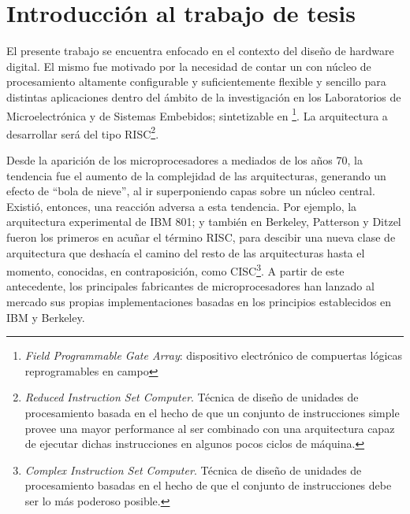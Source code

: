 \chapter{Introducción al trabajo de tesis}

El presente trabajo se encuentra enfocado en el contexto del diseño de hardware digital. El mismo fue motivado por la necesidad de contar un con núcleo de procesamiento altamente configurable y suficientemente flexible y sencillo para distintas aplicaciones dentro del ámbito de la investigación en los Laboratorios de Microelectrónica y de Sistemas Embebidos; sintetizable en \footnote{\label{FPGA} \emph{Field Programmable Gate Array}: dispositivo electrónico de compuertas lógicas reprogramables en campo}. La arquitectura a desarrollar será del tipo RISC\footnote{\label{RISC} \emph{Reduced Instruction Set Computer}. Técnica de diseño de unidades de procesamiento basada en el hecho de que un conjunto de instrucciones simple provee una mayor performance al ser combinado con una arquitectura capaz de ejecutar dichas instrucciones en algunos pocos ciclos de máquina.}.

Desde la aparición de los microprocesadores a mediados de los años 70, la tendencia fue el aumento de la complejidad de las arquitecturas, generando un efecto de ``bola de nieve'', al ir superponiendo capas sobre un núcleo central. Existió, entonces, una reacción adversa a esta tendencia. Por ejemplo, la arquitectura experimental de IBM 801; y también en Berkeley, Patterson y Ditzel fueron los primeros en acuñar el término RISC, para descibir una nueva clase de arquitectura que deshacía el camino del resto de las arquitecturas hasta el momento, conocidas, en contraposición, como CISC\footnote{\label{CISC} \emph{Complex Instruction Set Computer}. Técnica de diseño de unidades de procesamiento basadas en el hecho de que el conjunto de instrucciones debe ser lo más poderoso posible.}. A partir de este antecedente, los principales fabricantes de microprocesadores han lanzado al mercado sus propias implementaciones basadas en los principios establecidos en IBM y Berkeley.

